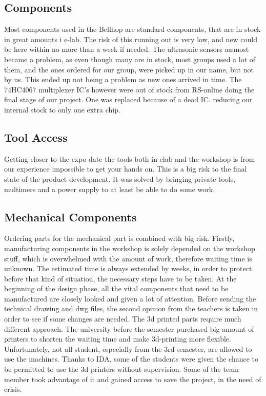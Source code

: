 \documentclass[11pt]{article}
\begin{document}
\subsection*{Components}
    Most components used in the Bellhop are standard components, that are in stock in great amounts i e-lab. The risk of this running out is very low, and new could be here within no more than a week if needed. The ultrasonic sensors aæmost became a problem, as even though many are in stock, most groups used a lot of them, and the ones ordered for our group, were picked up in our name, but not by us. This ended up not being a problem as new ones arrived in time. The 74HC4067 multiplexer IC’s however were out of stock from RS-online doing the final stage of our project. One was replaced because of a dead IC. reducing our internal stock to only one extra chip. 

\subsection*{Tool Access}
Getting closer to the expo date the tools both in elab and the workshop is from our experience impossible to get your hands on. This is a big risk to the final state of the product development. It was solved by bringing private tools, multimers and a power supply to at least be able to do some work. 

\subsection*{Mechanical Components}
Ordering parts for the mechanical part is combined with big risk. Firstly, manufacturing components in the workshop is solely depended on the workshop stuff, which is overwhelmed with the amount of work, therefore waiting time is unknown. The estimated time is always extended by weeks, in order to protect before that kind of situation, the necessary steps have to be taken. At the beginning of the design phase, all the vital components that need to be manufactured are closely looked and given a lot of attention. Before sending the technical drawing and dwg files, the second opinion from the teachers is taken in order to see if some changes are needed. The 3d printed parts require much different approach. The university before the semester purchased big amount of printers to shorten the waiting time and make 3d-printing more flexible. Unfortunately, not all student, especially from the 3rd semester, are allowed to use the machines. Thanks to IDA, some of the students were given the chance to be permitted to use the 3d printers without supervision. Some of the team member took advantage of it and gained access to save the project, in the need of crisis.
\end{document}

